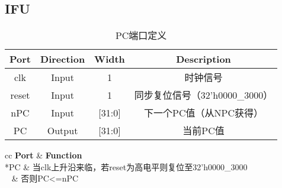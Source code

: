 \documentclass[UTF8]{ctexart}
\begin{document}
\subsection{IFU}
\begin{table}[H]
	\centering
	\begin{threeparttable}
		\caption{PC端口定义}
		\begin{tabular}{cccc}
			\toprule
			\rowcolor{mypink}
			\textbf{Port} & \textbf{Direction} & \textbf{Width} & \textbf{Description}           \\
			\midrule
			clk           & Input              & 1              & 时钟信号                       \\
			\midrule
			reset         & Input              & 1              & 同步复位信号（32'h0000\_3000） \\
			\midrule
			nPC           & Input              & [31:0]         & 下一个PC值（从NPC获得）        \\
			\midrule
			PC            & Output             & [31:0]         & 当前PC值                       \\
			\midrule
		\end{tabular}
	\end{threeparttable}
\end{table}
\begin{table}[H]
	\centering
	\begin{threeparttable}
		\caption{PC功能定义}
		\begin{tabular}{cc}
			\toprule
			\rowcolor{mypink}
			\textbf{Port}     & \textbf{Function}                                      \\
			\midrule
			*{PC} & 当clk上升沿来临，若reset为高电平则复位至32'h0000\_3000 \\
			~                 & 否则PC<=nPC                                            \\
			\midrule
		\end{tabular}
	\end{threeparttable}
\end{table}
\end{document}
